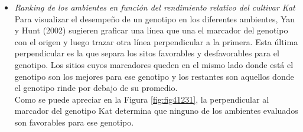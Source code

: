 \begin{itemize}[wide, nosep, labelindent = 0pt, topsep = 1ex, noitemsep,topsep=0pt]



\item \emph{Ranking de los ambientes en función del rendimiento relativo del cultivar Kat}\\

Para visualizar el desempeño de un genotipo en los diferentes ambientes, Yan y Hunt (2002) sugieren graficar una línea que una el marcador del genotipo con el origen y luego trazar otra línea perpendicular a la primera. Esta última perpendicular es la que separa los sitos favorables y desfavorables para el genotipo. Los sitios cuyos marcadores queden en el mismo lado donde está el genotipo son los mejores para ese genotipo y los restantes son aquellos donde el genotipo rinde por debajo de su promedio.\\
Como se puede apreciar en la Figura \ref{fig:fig41231}, la perpendicular al marcador del genotipo Kat determina que ninguno de los ambientes evaluados son favorables para ese genotipo.\\


\end{itemize}
